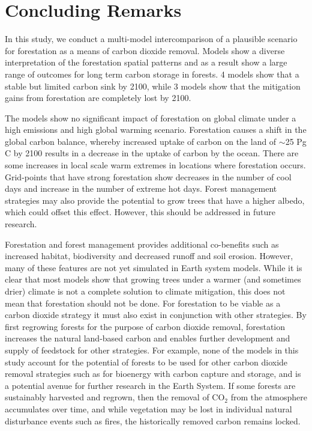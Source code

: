 \documentclass[]{article}
\begin{document}
\section{Concluding Remarks}

In this study, we conduct a multi-model intercomparison of a plausible scenario for forestation as a means of carbon dioxide removal.
Models show a diverse interpretation of the forestation spatial patterns and as a result show a large range of outcomes for long term carbon storage in forests.
4 models show that a stable but limited carbon sink by 2100, while 3 models show that the mitigation gains from forestation are completely lost by 2100.

The models show no significant impact of forestation on global climate under a high emissions and high global warming scenario.
Forestation causes a shift in the global carbon balance, whereby increased uptake of carbon on the land of $\sim$25 Pg C by 2100 results in a decrease in the uptake of carbon by the ocean.
There are some increases in local scale warm extremes in locations where forestation occurs.
Grid-points that have strong forestation show decreases in the number of cool days and increase in the number of extreme hot days.
Forest management strategies may also provide the potential to grow trees that have a higher albedo, which could offset this effect.
However, this should be addressed in future research.

Forestation and forest management provides additional co-benefits such as increased habitat, biodiversity and decreased runoff and soil erosion.
However, many of these features are not yet simulated in Earth system models.
While it is clear that most models show that growing trees under a warmer (and sometimes drier) climate is not a complete solution to climate mitigation, this does not mean that forestation should not be done.
For forestation to be viable as a carbon dioxide strategy it must also exist in conjunction with other strategies.
By first regrowing forests for the purpose of carbon dioxide removal, forestation increases the natural land-based carbon and enables further development and supply of feedstock for other strategies. 
For example, none of the models in this study account for the potential of forests to be used for other carbon dioxide removal strategies such as for bioenergy with carbon capture and storage, and is a potential avenue for further research in the Earth System.
If some forests are sustainably harvested and regrown, then the removal of CO$_2$ from the atmosphere accumulates over time, and while vegetation may be lost in individual natural disturbance events such as fires, the historically removed carbon remains locked.
\end{document}
